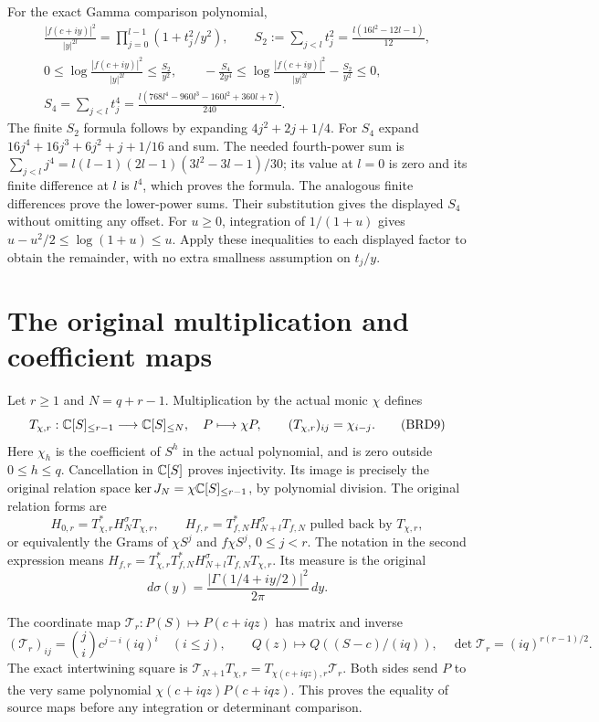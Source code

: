 For the exact Gamma comparison polynomial,
\[
\begin{gathered}
 \frac{|f(c+iy)|^2}{|y|^{2l}}
    =\prod_{j=0}^{l-1}(1+t_j^2/y^2),\qquad
 S_2:=\sum_{j<l}t_j^2=\frac{l(16l^2-12l-1)}{12},\\
 0\leq\log\frac{|f(c+iy)|^2}{|y|^{2l}}
        \leq\frac{S_2}{y^2},\qquad
 -\frac{S_4}{2y^4}\leq
 \log\frac{|f(c+iy)|^2}{|y|^{2l}}-\frac{S_2}{y^2}\leq0,\\
 S_4=\sum_{j<l}t_j^4
 =\frac{l(768l^4-960l^3-160l^2+360l+7)}{240}.
\end{gathered}\tag{BRD8}
\]
The finite $S_2$ formula follows by expanding $4j^2+2j+1/4$.
For $S_4$ expand $16j^4+16j^3+6j^2+j+1/16$ and sum.
The needed fourth-power sum is
$\sum_{j<l}j^4=l(l-1)(2l-1)(3l^2-3l-1)/30$;
its value at $l=0$ is zero and its finite difference at $l$
is $l^4$, which proves the formula. The analogous finite
differences prove the lower-power sums. Their substitution gives
the displayed $S_4$ without omitting any offset.
For $u\geq0$, integration of $1/(1+u)$ gives
$u-u^2/2\leq\log(1+u)\leq u$. Apply these inequalities to
each displayed factor to obtain the remainder, with no extra
smallness assumption on $t_j/y$.

\section{The original multiplication and coefficient maps}

Let $r\geq1$ and $N=q+r-1$. Multiplication by the actual monic
$\chi$ defines
\[
 T_{\chi,r}:\mathbb C[S]_{\leq r-1}\longrightarrow\mathbb C[S]_{\leq N},
 \quad P\longmapsto\chi P,
 \qquad (T_{\chi,r})_{ij}=\chi_{i-j}.
\tag{BRD9}
\]
Here $\chi_h$ is the coefficient of $S^h$ in the actual polynomial,
and is zero outside $0\leq h\leq q$. Cancellation in $\mathbb C[S]$
proves injectivity. Its image is precisely the original relation
space $\ker J_N=\chi\mathbb C[S]_{\leq r-1}$, by polynomial division.
The original relation forms are
\[
 H_{0,r}=T_{\chi,r}^*H_N^\sigma T_{\chi,r},\qquad
 H_{f,r}=T_{f,N}^*H_{N+l}^\sigma T_{f,N}
             \text{ pulled back by }T_{\chi,r},
\tag{BRD10}
\]
or equivalently the Grams of $\chi S^j$ and $f\chi S^j$,
$0\leq j<r$. The notation in the second expression means
$H_{f,r}=T_{\chi,r}^*T_{f,N}^*H_{N+l}^\sigma
T_{f,N}T_{\chi,r}$. Its measure is the original
\[
 d\sigma(y)=\frac{|\Gamma(1/4+iy/2)|^2}{2\pi}\,dy.
\tag{BRD11}
\]

The coordinate map $\mathcal T_r:P(S)\mapsto P(c+iqz)$ has
matrix and inverse
\[
 (\mathcal T_r)_{ij}=\binom ji c^{j-i}(iq)^i\quad(i\leq j),
 \qquad Q(z)\longmapsto Q((S-c)/(iq)),
 \quad\det\mathcal T_r=(iq)^{r(r-1)/2}.
\tag{BRD12}
\]
The exact intertwining square is
$\mathcal T_{N+1}T_{\chi,r}=T_{\chi(c+iqz),r}\mathcal T_r$.
Both sides send $P$ to the very same polynomial
$\chi(c+iqz)P(c+iqz)$. This proves the equality of source
maps before any integration or determinant comparison.

